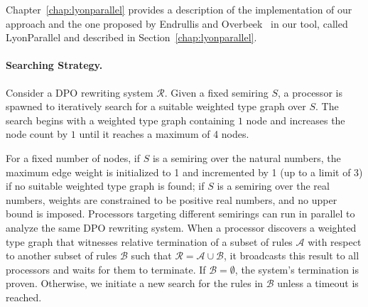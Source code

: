 Chapter~\ref{chap:lyonparallel} provides a description of the implementation of our approach and the one proposed by Endrullis and Overbeek~\cite{endrullis2024generalized_arxiv_v2} in our tool, called LyonParallel and described in Section~\ref{chap:lyonparallel}.

\paragraph{Searching Strategy.}
Consider a DPO rewriting system $\mathcal{R}$. Given a fixed semiring $S$, a processor is spawned to iteratively search for a suitable weighted type graph over $S$.
The search begins with a weighted type graph containing $1$ node and increases the node count by $1$ until it reaches a maximum of 4 nodes.

For a fixed number of nodes,
 if $S$ is a semiring over the natural numbers, the maximum edge weight is initialized to 1 and incremented by 1 (up to a limit of 3) if no suitable weighted type graph is found;
if $S$ is a semiring over the real numbers, weights are constrained to be positive real numbers, and no upper bound is imposed.
Processors targeting different semirings can run in parallel to analyze the same DPO rewriting system.
When a processor discovers a weighted type graph that witnesses relative termination of a subset of rules $\mathcal{A}$ with respect to another subset of rules $\mathcal{B}$ such that $\mathcal{R} \mathop{=} \mathcal{A} \mathop{\cup} \mathcal{B}$, it broadcasts this result to all processors and waits for them to terminate. If $\mathcal{B} \mathop{=} \emptyset$, the system's termination is proven. Otherwise, we initiate a new search for the rules in $\mathcal{B}$ unless a timeout is reached.
 
